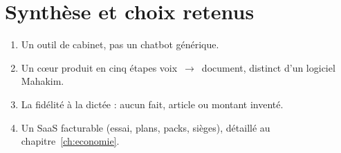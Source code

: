 \section{Synthèse et choix retenus}

\begin{enumerate}[leftmargin=1.4em]
  \item Un outil de cabinet, pas un chatbot générique.
  \item Un cœur produit en cinq étapes voix~$\rightarrow$~document, distinct d'un logiciel Mahakim.
  \item La fidélité à la dictée : aucun fait, article ou montant inventé.
  \item Un SaaS facturable (essai, plans, packs, sièges), détaillé au chapitre~\ref{ch:economie}.
\end{enumerate}
